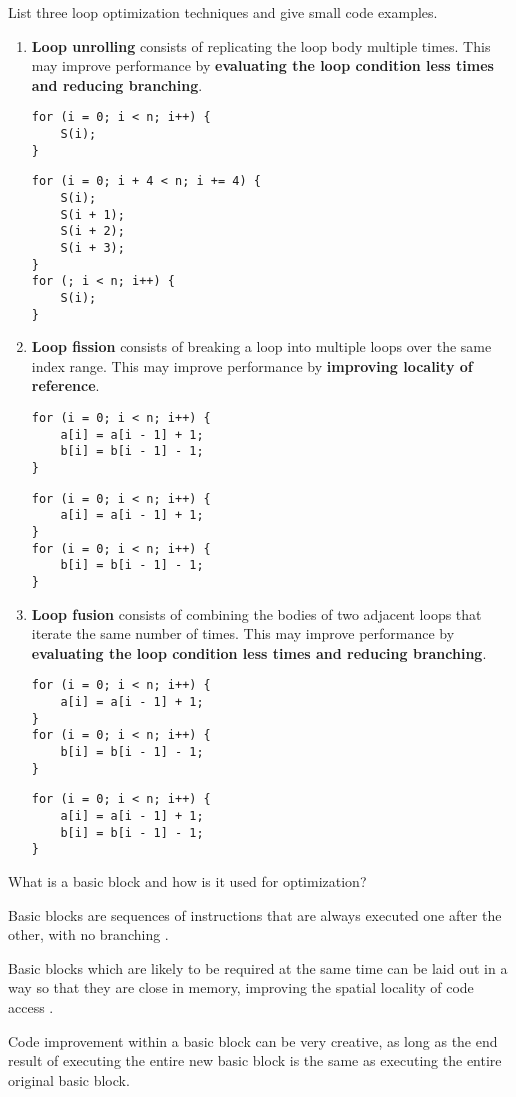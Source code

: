 \begin{Exercise}[difficulty=1]
List three loop optimization techniques and give small code examples.
\end{Exercise}
\begin{Answer}
\begin{enumerate}
\item \textbf{Loop unrolling} consists of replicating the loop body multiple times.
This may improve performance by \textbf{evaluating the loop condition less times and reducing branching}.
\begin{lstlisting}
for (i = 0; i < n; i++) {
    S(i);
}
\end{lstlisting}
\begin{lstlisting}
for (i = 0; i + 4 < n; i += 4) {
    S(i);
    S(i + 1);
    S(i + 2);
    S(i + 3);
}
for (; i < n; i++) {
    S(i);
}
\end{lstlisting}
\item \textbf{Loop fission} consists of breaking a loop into multiple loops over the same index range.
This may improve performance by \textbf{improving locality of reference}.
\begin{lstlisting}
for (i = 0; i < n; i++) {
    a[i] = a[i - 1] + 1;
    b[i] = b[i - 1] - 1;
}
\end{lstlisting}
\begin{lstlisting}
for (i = 0; i < n; i++) {
    a[i] = a[i - 1] + 1;
}
for (i = 0; i < n; i++) {
    b[i] = b[i - 1] - 1;
}
\end{lstlisting}
\item \textbf{Loop fusion} consists of combining the bodies of two adjacent loops that iterate the same number of times.
This may improve performance by \textbf{evaluating the loop condition less times and reducing branching}.
\begin{lstlisting}
for (i = 0; i < n; i++) {
    a[i] = a[i - 1] + 1;
}
for (i = 0; i < n; i++) {
    b[i] = b[i - 1] - 1;
}
\end{lstlisting}
\begin{lstlisting}
for (i = 0; i < n; i++) {
    a[i] = a[i - 1] + 1;
    b[i] = b[i - 1] - 1;
}
\end{lstlisting}
\end{enumerate}
\end{Answer}

\begin{Exercise}[difficulty=1]
What is a basic block and how is it used for optimization?
\end{Exercise}
\begin{Answer}
Basic blocks are sequences of instructions that are always executed one after the other, with no branching \cite[p.~92]{compilers-aho-2007}.

Basic blocks which are likely to be required at the same time can be laid out in a way so that they are close in memory, improving the spatial locality of code access \cite[p.~457]{compilers-aho-2007}.

Code improvement within a basic block can be very creative, as long as the end result of executing the entire new basic block is the same as executing the entire original basic block.
\end{Answer}

